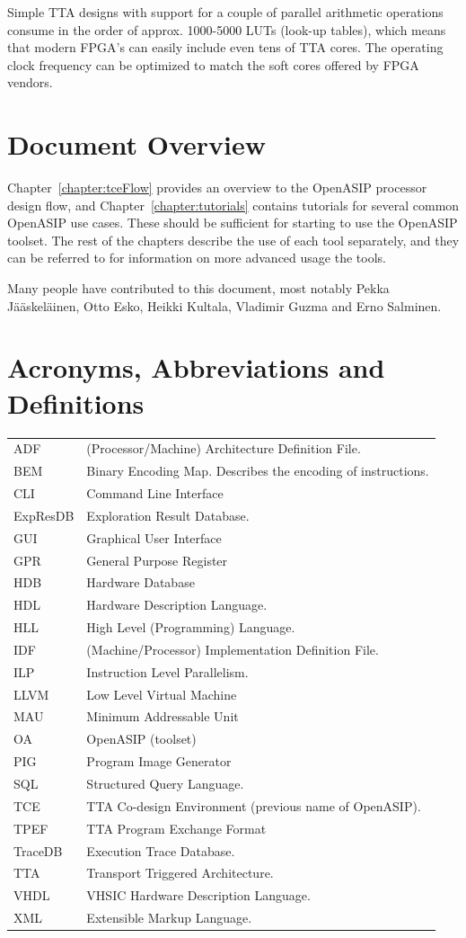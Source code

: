 \documentclass[a4paper,twoside]{tceusermanual}
\begin{document}
Simple TTA designs with support for a couple of
parallel arithmetic operations consume in the order of
approx. 1000-5000 LUTs (look-up tables), which means that modern FPGA's
can easily include even tens of TTA cores. The operating clock frequency can
be optimized to match the soft cores offered by FPGA vendors.

\section{Document Overview}

Chapter~\ref{chapter:tceFlow} provides an overview to the OpenASIP
processor design flow, and Chapter~\ref{chapter:tutorials} contains
tutorials for several common OpenASIP use cases. These should be sufficient
for starting to use the OpenASIP toolset.  The rest of the chapters
describe the use of each tool separately, and they can be referred to
for information on more advanced usage the tools.

Many people have contributed to this document, most notably Pekka
Jääskeläinen, Otto Esko, Heikki Kultala, Vladimir Guzma and Erno
Salminen.


\section{Acronyms, Abbreviations and Definitions}
\begin{tabular}[h]{p{}p{}}
ADF & (Processor/Machine) Architecture Definition File.\\
BEM & Binary Encoding Map. Describes the encoding of instructions.\\
CLI & Command Line Interface\\
ExpResDB  & Exploration Result Database.\\
GUI & Graphical User Interface \\
GPR & General Purpose Register \\
HDB & Hardware Database \\
HDL & Hardware Description Language. \\
HLL & High Level (Programming) Language. \\
IDF & (Machine/Processor) Implementation Definition File.\\
ILP & Instruction Level Parallelism.\\
LLVM & Low Level Virtual Machine \\
MAU & Minimum Addressable Unit\\
OA & OpenASIP (toolset) \\
PIG & Program Image Generator\\
SQL & Structured Query Language.\\
TCE & TTA Co-design Environment (previous name of OpenASIP).\\
TPEF & TTA Program Exchange Format \\
TraceDB & Execution Trace Database. \\
TTA & Transport Triggered Architecture.\\
VHDL & VHSIC Hardware Description Language. \\
XML & Extensible Markup Language. \\
\end{tabular}
\end{document}
